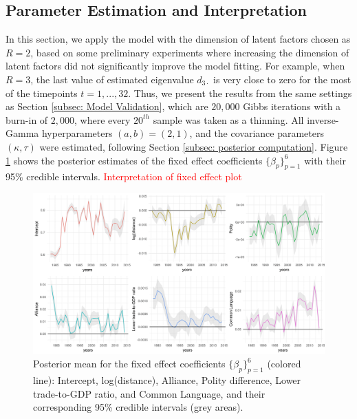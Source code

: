 \documentclass[a4paper]{article}
\begin{document}
\subsection{Parameter Estimation and Interpretation}\label{subsec: UNresult}
In this section, we apply the model with the dimension of latent factors chosen as $R=2$, based on some preliminary experiments where increasing the dimension of latent factors did not significantly improve the model fitting. For example, when $R=3$, the last value of estimated eigenvalue $d_{3\cdot}$ is very close to zero for the most of the timepoints $t=1,...,32$. Thus, we present the results from the same settings as Section \ref{subsec: Model Validation}, which are $20,000$ Gibbs iterations with a burn-in of $2,000$, where every $20^{th}$ sample was taken as a thinning. All inverse-Gamma hyperparameters $(a, b) = (2, 1)$, and the covariance parameters $(\kappa, \tau)$ were estimated, following Section \ref{subsec: posterior computation}. Figure \ref{figure:interceptplot} shows the posterior estimates of the fixed effect coefficients $\{\beta_p\}_{p=1}^6$ with their 95\% credible intervals. \textcolor{red}{Interpretation of fixed effect plot} 
\begin{figure}[ht]
	\begin{center}
		\includegraphics[width=1\textwidth]{plots_paper/betaplot-1.png}
	\end{center}
	 	\caption {Posterior mean for the fixed effect coefficients $\{\beta_p\}_{p=1}^6$  (colored line): Intercept, log(distance), Alliance, Polity difference, Lower trade-to-GDP ratio, and Common Language, and their corresponding 95\% credible intervals (grey areas). }
	\label{figure:interceptplot}
\end{figure}
 \newpage
\end{document}
